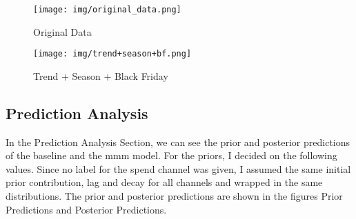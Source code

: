 \documentclass{article}
\begin{document}
\begin{figure}[H]
    \centering
    \begin{minipage}[t]{0.48\textwidth}
        \centering
        \texttt{[image: img/original\_data.png]}
        \caption{Original Data}
        \label{fig:original_data}
    \end{minipage}
    \hfill
    \begin{minipage}[t]{0.48\textwidth}
        \centering
        \texttt{[image: img/trend+season+bf.png]}
        \caption{Trend + Season + Black Friday}
        \label{fig:trend_season_bf}
    \end{minipage}
\end{figure}



\subsection{Prediction Analysis}

In the Prediction Analysis Section, we can see the prior and posterior predictions of the baseline and the mmm model.
For the priors, I decided on the following values. Since no label for the spend channel was given, I assumed the same initial prior contribution, lag and decay for all channels
and wrapped in the same distributions. The prior and posterior predictions are shown in the figures Prior Predictions and Posterior Predictions.
\end{document}
